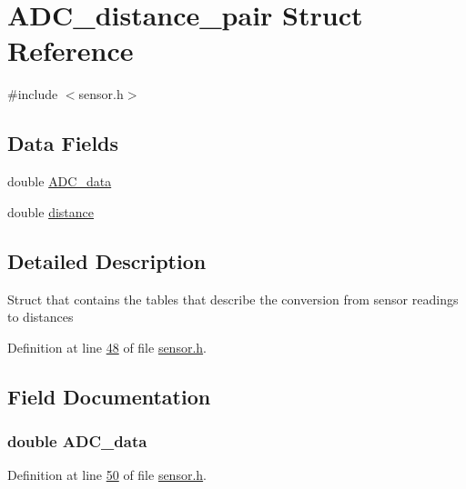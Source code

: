\hypertarget{struct_a_d_c__distance__pair}{}\section{A\+D\+C\+\_\+distance\+\_\+pair Struct Reference}
\label{struct_a_d_c__distance__pair}


{\ttfamily \#include $<$sensor.\+h$>$}

\subsection*{Data Fields}
\begin{DoxyCompactItemize}
\item 
double \hyperlink{struct_a_d_c__distance__pair_aa001cc67b1ec73e43eb6bd32d24a739b}{A\+D\+C\+\_\+data}
\item 
double \hyperlink{struct_a_d_c__distance__pair_a79b8e036dca6911e3295a47d99f21f43}{distance}
\end{DoxyCompactItemize}


\subsection{Detailed Description}
Struct that contains the tables that describe the conversion from sensor readings to distances 

Definition at line \hyperlink{sensor_8h_source_l00048}{48} of file \hyperlink{sensor_8h_source}{sensor.\+h}.



\subsection{Field Documentation}
\subsubsection[{\texorpdfstring{A\+D\+C\+\_\+data}{ADC_data}}]{\setlength{\rightskip}{0pt plus 5cm}double A\+D\+C\+\_\+data}\hypertarget{struct_a_d_c__distance__pair_aa001cc67b1ec73e43eb6bd32d24a739b}{}\label{struct_a_d_c__distance__pair_aa001cc67b1ec73e43eb6bd32d24a739b}


Definition at line \hyperlink{sensor_8h_source_l00050}{50} of file \hyperlink{sensor_8h_source}{sensor.\+h}.

